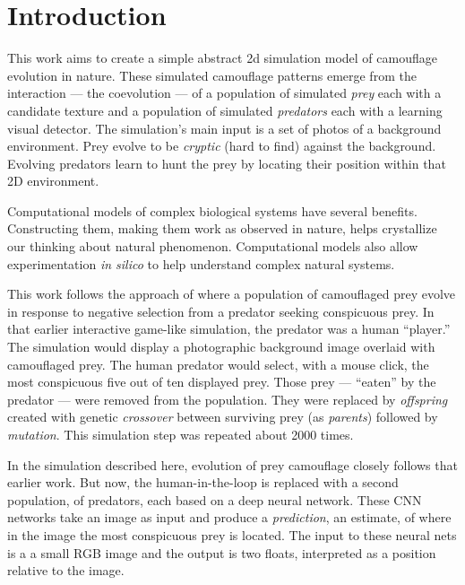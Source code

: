 \documentclass[acmtog]{acmart}
\newcommand{\jargon}[1]{\textit{#1}}
\begin{document}
\section{Introduction}
This work aims to create a simple abstract 2d simulation model of camouflage evolution in nature. These simulated camouflage patterns emerge from the interaction — the coevolution — of a population of simulated \jargon{prey} each with a candidate texture and a population of simulated \jargon{predators} each with a learning visual detector. The simulation's main input is a set of photos of a background environment. Prey evolve to be \jargon{cryptic} (hard to find) against the background. Evolving predators learn to hunt the prey by locating their position within that 2D environment.
\par
Computational models of complex biological systems have several benefits. Constructing them, making them work as observed in nature, helps crystallize our thinking about natural phenomenon. Computational models also allow experimentation \textit{in silico} to help understand complex natural systems.
\par
This work follows the approach of \citet{reynolds_iec_2011} where a population of camouflaged prey evolve in response to negative selection from a predator seeking conspicuous prey. In that earlier interactive game-like simulation, the predator was a human “player.” The simulation would display a photographic background image overlaid with camouflaged prey. The human predator would select, with a mouse click, the most conspicuous five out of ten displayed prey. Those prey — “eaten” by the predator — were removed from the population.  They were replaced by \jargon{offspring} created with genetic \jargon{crossover} between surviving prey (as \jargon{parents}) followed by \jargon{mutation}. This simulation step was repeated about 2000 times.
\par
In the simulation described here, evolution of prey camouflage closely follows that earlier work. But now, the human-in-the-loop is replaced with a second population, of predators, each based on a deep neural network. These CNN networks take an image as input and produce a \jargon{prediction}, an estimate, of where in the image the most conspicuous prey is located. The input to these neural nets is a a small RGB image and the output is two floats, interpreted as a position relative to the image. 
\par
\end{document}
